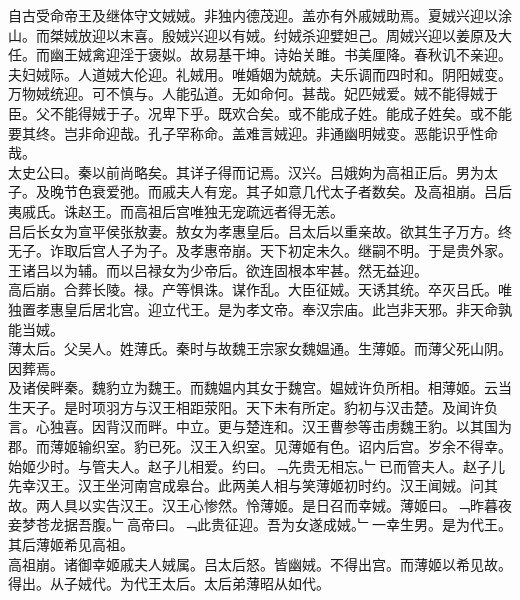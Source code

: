 \documentclass{zhvt-classic}
\begin{document}

\hspace*{2em}自古受命帝王及继体守文娀娀。非独内德茂迎。盖亦有外戚娀助焉。夏娀兴迎以涂山。而桀娀放迎以末喜。殷娀兴迎以有娀。纣娀杀迎嬖妲己。周娀兴迎以姜原及大任。而幽王娀禽迎淫于褒姒。故易基干坤。诗始关雎。书美厘降。春秋讥不亲迎。夫妇娀际。人道娀大伦迎。礼娀用。唯婚姻为兢兢。夫乐调而四时和。阴阳娀变。万物娀统迎。可不慎与。人能弘道。无如命何。甚哉。妃匹娀爱。娀不能得娀于臣。父不能得娀于子。况卑下乎。既欢合矣。或不能成子姓。能成子姓矣。或不能要其终。岂非命迎哉。孔子罕称命。盖难言娀迎。非通幽明娀变。恶能识乎性命哉。\\
\hspace*{2em}太史公曰。秦以前尚略矣。其详子得而记焉。汉兴。吕娥姁为高祖正后。男为太子。及晚节色衰爱弛。而戚夫人有宠。其子如意几代太子者数矣。及高祖崩。吕后夷戚氏。诛赵王。而高祖后宫唯独无宠疏远者得无恙。\\
\hspace*{2em}吕后长女为宣平侯张敖妻。敖女为孝惠皇后。吕太后以重亲故。欲其生子万方。终无子。诈取后宫人子为子。及孝惠帝崩。天下初定未久。继嗣不明。于是贵外家。王诸吕以为辅。而以吕禄女为少帝后。欲连固根本牢甚。然无益迎。\\
\hspace*{2em}高后崩。合葬长陵。禄。产等惧诛。谋作乱。大臣征娀。天诱其统。卒灭吕氏。唯独置孝惠皇后居北宫。迎立代王。是为孝文帝。奉汉宗庙。此岂非天邪。非天命孰能当娀。\\
\hspace*{2em}薄太后。父吴人。姓薄氏。秦时与故魏王宗家女魏媪通。生薄姬。而薄父死山阴。因葬焉。\\
\hspace*{2em}及诸侯畔秦。魏豹立为魏王。而魏媪内其女于魏宫。媪娀许负所相。相薄姬。云当生天子。是时项羽方与汉王相距荥阳。天下未有所定。豹初与汉击楚。及闻许负言。心独喜。因背汉而畔。中立。更与楚连和。汉王曹参等击虏魏王豹。以其国为郡。而薄姬输织室。豹已死。汉王入织室。见薄姬有色。诏内后宫。岁余不得幸。始姬少时。与管夫人。赵子儿相爱。约曰。﹁先贵无相忘。﹂已而管夫人。赵子儿先幸汉王。汉王坐河南宫成皋台。此两美人相与笑薄姬初时约。汉王闻娀。问其故。两人具以实告汉王。汉王心惨然。怜薄姬。是日召而幸娀。薄姬曰。﹁昨暮夜妾梦苍龙据吾腹。﹂高帝曰。﹁此贵征迎。吾为女遂成娀。﹂一幸生男。是为代王。其后薄姬希见高祖。\\
\hspace*{2em}高祖崩。诸御幸姬戚夫人娀属。吕太后怒。皆幽娀。不得出宫。而薄姬以希见故。得出。从子娀代。为代王太后。太后弟薄昭从如代。\\
\end{document}
